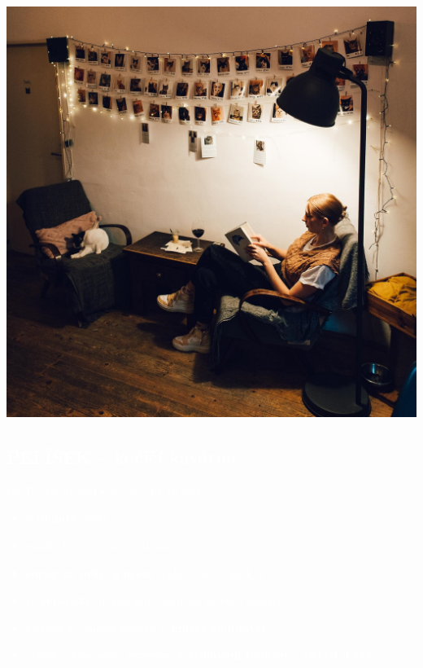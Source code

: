 \documentclass[a5paper, twoside]{article}
\begin{document}
\begin{yellowbox}
	\begin{minipage}{0.27\textwidth}
		\includegraphics[width=\linewidth]{pelisek.jpg}
	\end{minipage}
	\hfill
	\begin{minipage}{0.7\textwidth}
		\vspace{-5pt}
		\textcolor{white}{
			\subsection*{PELÍŠEK -- kočičí kavárna}
			Po--Pá: 10--21 hod $\bullet$ So, Ne: 13--19 hod
			\small
			\begin{itemize}[leftmargin=10pt]
				\item \textbf{3 minuty} pěšky
				\item značka kávy: různí se, hlavně 
				\item \textbf{super na práci a učení} (pokud sneseš kočky)
				\item \textbf{je veganský}, najdeš tam veganské toasty i dezerty
				\item kteroukoli tamější kočičku si \textbf{můžeš adoptovat}
				\item obsluha doporučuje \textbf{espresso s višňovým tonicem} a \textbf{naked dorty}
			\end{itemize}
		}
	\end{minipage}
\end{yellowbox}
\end{document}
